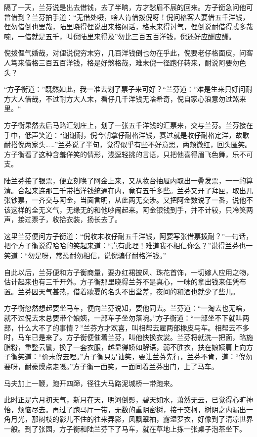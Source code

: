 \documentclass[12pt,UTF8]{ctexbook}
\begin{document}
{{{隔了一天，兰芬说是出去借钱，去了半晌，方才愁眉不展的回来。方子衡急问他可曾借到？兰芬拍手道：“无借处嗫，啥人肯借拨倪呀！倪问格客人要借五千洋钱，俚勿借倒也罢哉，陆里晓得俚说出来格闲话，格末来得讨气，俚倒说耐借得忒多哉啘，一借就是五千，叫倪陆里来得及”勿比三百五百洋钱，倪还好应酬应酬。

倪拨俚气婚哉，对俚说倪穷末穷，几百洋钱倒也勿在乎此，倪要老仔格面皮，问客人笃来借格三百五百洋钱，格是好煞格哉，难末倪一径跑仔转来，耐说阿要勿色头？

“方子衡道：”既然如此，我一准去划了票子来可好？“兰芬道：”难是生来只好问耐方大人借哉，不过耐方大人末，看仔几千洋钱无啥希奇，倪自家心浪意勿过煞来里。“

方子衡果然去后马路汇划庄上，划了一张五千洋钱的汇票来，交与兰芬。兰芬接在手中，低声笑道：“谢谢耐，倪今朝拿仔耐格洋钱，赛过就是收仔耐格定洋，故歇耐搭倪两家头……”兰芬说了半句，觉得似乎有些不好意思，两颊微红，回头匿笑。方子衡看了这种含羞佯笑的情形，浅逗轻挑的言语，只把他喜得眉飞色舞，乐不可支。

陆兰芬接了银票，便立刻唤了阿金上来，又从妆台抽屉内取出一叠发票，一一的算清。合起来连那三千带挡洋钱统通在内，竟有五千多些。兰芬又开了拜匣，取出几张钞票，一齐交与阿金，当面言明，从此两无交涉。又把阿金数说了一番，说他不该这样的全无义气，无缘无的和他吵闹起来。阿金银钱到手，并不计较，只冷笑两声，接过票子，收拾衣装，扬长去了。

这里兰芬便问方子衡道：“倪收末收仔耐五千洋钱，阿要写张借票拨耐？”一句话，把个方子衡说得哈哈的笑起来道：“岂有此理！难道我不相信你么？”说得兰芬也一笑道：“勿是呀，常恐耐勿相信，说倪骗仔耐格洋钱。”

自此以后，兰芬便和方子衡商量，要办红裙披风、珠花首饰，一切嫁人应用之物，估计起来也有三千开外。方子衡那里晓得兰芬不是真心，一味的拿出钱来任凭布置。兰芬因天气甚热，借着歇夏的名头不出堂差，夜间的和酒也就少了些儿。

方子衡忽然想起要坐马车，便向兰芬说知，要他同去。兰芬道：“一淘去也无啥，就不过倪去末总要带个娘姨，一部车子坐勿落啘。”方子衡道：“一部坐不下就叫两部，什么大不了的事情？”兰芬方才欢喜，叫相帮去雇两部橡皮马车。相帮去不多时，马车已是来了。方子衡便催着兰芬，叫他快换衣裳。兰芬将就洗一把面，略施脂粉，重整云鬟，换了一套衣服，越显得娇如解语，弱不胜衣，扶在娘姨肩上向方子衡笑道：“价末倪去哩。”方子衡只是讪笑，要让兰芬先行，兰芬不肯，道：“倪勿要呀，耐豪燥点走嗫。”方子衡一面笑，一面同着兰芬出门，上了马车。

马夫加上一鞭，跑开四蹄，径往大马路泥城桥一带跑来。

此时正是六月初天气，新月在天，明河倒影，碧天如水，萧然无云，已觉得心旷神怡，烦恼尽去。再过了跑马厅一带，无数的重阴密树，接干交柯，树阴之内漏出一角月光，那树枝的影儿不住的往来弄影，风飘翠袖，露湿罗衣，好像到了清凉世界一般。到了张园，方子衡和陆兰芬下了马车，就在草地上拣一张桌子泡茶坐下。

}}}
\end{document}
